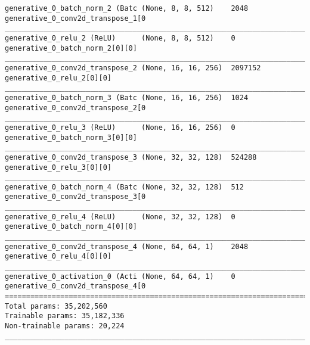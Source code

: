 \begin{lstlisting}[caption={dSprites-VLAE-GAN Decoder},captionpos=b,basicstyle=\tiny, label={lst:mnist-vlae-gan-decoder}]
generative_0_batch_norm_2 (Batc (None, 8, 8, 512)    2048        generative_0_conv2d_transpose_1[0
__________________________________________________________________________________________________
generative_0_relu_2 (ReLU)      (None, 8, 8, 512)    0           generative_0_batch_norm_2[0][0]
__________________________________________________________________________________________________
generative_0_conv2d_transpose_2 (None, 16, 16, 256)  2097152     generative_0_relu_2[0][0]
__________________________________________________________________________________________________
generative_0_batch_norm_3 (Batc (None, 16, 16, 256)  1024        generative_0_conv2d_transpose_2[0
__________________________________________________________________________________________________
generative_0_relu_3 (ReLU)      (None, 16, 16, 256)  0           generative_0_batch_norm_3[0][0]
__________________________________________________________________________________________________
generative_0_conv2d_transpose_3 (None, 32, 32, 128)  524288      generative_0_relu_3[0][0]
__________________________________________________________________________________________________
generative_0_batch_norm_4 (Batc (None, 32, 32, 128)  512         generative_0_conv2d_transpose_3[0
__________________________________________________________________________________________________
generative_0_relu_4 (ReLU)      (None, 32, 32, 128)  0           generative_0_batch_norm_4[0][0]
__________________________________________________________________________________________________
generative_0_conv2d_transpose_4 (None, 64, 64, 1)    2048        generative_0_relu_4[0][0]
__________________________________________________________________________________________________
generative_0_activation_0 (Acti (None, 64, 64, 1)    0           generative_0_conv2d_transpose_4[0
==================================================================================================
Total params: 35,202,560
Trainable params: 35,182,336
Non-trainable params: 20,224
__________________________________________________________________________________________________
\end{lstlisting}